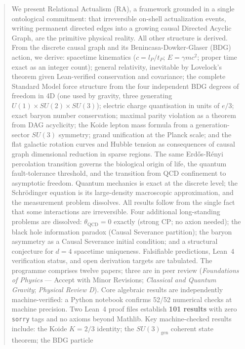 \documentclass[11pt,a4paper]{article}
\begin{document}
\begin{titlepage}
\begin{abstract}
We present Relational Actualism (RA), a framework grounded in a single
ontological commitment: that irreversible on-shell actualization events,
writing permanent directed edges into a growing causal Directed Acyclic Graph,
are the primitive physical reality. All other structure is derived.
From the discrete causal graph and its Benincasa-Dowker-Glaser (BDG) action,
we derive: spacetime kinematics ($c = l_P/t_P$; $E = \gamma mc^2$; proper time
exact as an integer count); general relativity, inevitable by Lovelock's theorem
given Lean-verified conservation and covariance; the complete Standard Model
force structure from the four independent BDG degrees of freedom in 4D (one
used by gravity, three generating $U(1)\times SU(2)\times SU(3)$); electric
charge quantisation in units of $e/3$; exact baryon number conservation;
maximal parity violation as a theorem from DAG acyclicity; the Koide lepton
mass formula from a generation-sector $SU(3)$ symmetry; grand unification at
the Planck scale; and the flat galactic rotation curves and Hubble tension
as consequences of causal graph dimensional reduction in sparse regions.
The same Erd\H{o}s-R\'{e}nyi percolation transition governs the biological
origin of life, the quantum fault-tolerance threshold, and the transition from
QCD confinement to asymptotic freedom.
Quantum mechanics is exact at the discrete level; the Schr\"{o}dinger equation
is its large-density macroscopic approximation, and the measurement problem
dissolves. All results follow from the single fact that some interactions are
irreversible. Four additional long-standing problems are dissolved: $\theta_{\mathrm{QCD}} = 0$ exactly (strong CP; no axion needed); the black hole information paradox (Causal Severance partition); the baryon asymmetry as a Causal Severance initial condition; and a structural conjecture for $d = 4$ spacetime uniqueness. Falsifiable predictions, Lean~4 verification status, and open
derivation targets are tabulated. The programme comprises twelve papers;
three are in peer review (\emph{Foundations of Physics} — Accept with
Minor Revisions; \emph{Classical and Quantum Gravity}; \emph{Physical Review D}).
Core algebraic results are independently machine-verified: a Python
notebook confirms 52/52 numerical checks at machine precision.
Two Lean~4 proof files establish \textbf{101 results} with zero
\texttt{sorry} tags and no axioms beyond Mathlib.
Key machine-checked results include: the Koide $K = 2/3$ identity;
the $SU(3)_{\mathrm{gen}}$ coherent state theorem; the BDG particle

\end{abstract}
\end{titlepage}
\end{document}
